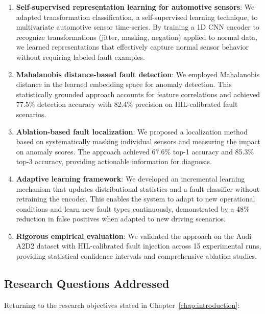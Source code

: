 \begin{enumerate}
    \item \textbf{Self-supervised representation learning for automotive sensors}: We adapted transformation classification, a self-supervised learning technique, to multivariate automotive sensor time-series. By training a 1D CNN encoder to recognize transformations (jitter, masking, negation) applied to normal data, we learned representations that effectively capture normal sensor behavior without requiring labeled fault examples.

    \item \textbf{Mahalanobis distance-based fault detection}: We employed Mahalanobis distance in the learned embedding space for anomaly detection. This statistically grounded approach accounts for feature correlations and achieved 77.5\% detection accuracy with 82.4\% precision on HIL-calibrated fault scenarios.

    \item \textbf{Ablation-based fault localization}: We proposed a localization method based on systematically masking individual sensors and measuring the impact on anomaly scores. The approach achieved 67.6\% top-1 accuracy and 85.3\% top-3 accuracy, providing actionable information for diagnosis.

    \item \textbf{Adaptive learning framework}: We developed an incremental learning mechanism that updates distributional statistics and a fault classifier without retraining the encoder. This enables the system to adapt to new operational conditions and learn new fault types continuously, demonstrated by a 48\% reduction in false positives when adapted to new driving scenarios.

    \item \textbf{Rigorous empirical evaluation}: We validated the approach on the Audi A2D2 dataset with HIL-calibrated fault injection across 15 experimental runs, providing statistical confidence intervals and comprehensive ablation studies.
\end{enumerate}

\subsection{Research Questions Addressed}

Returning to the research objectives stated in Chapter~\ref{chap:introduction}:

